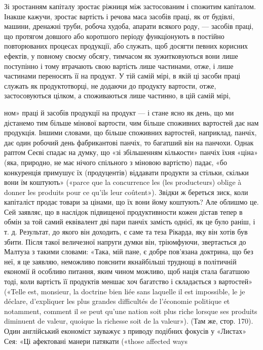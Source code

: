 Зі зростанням капіталу зростає ріжниця між застосованим
і спожитим капіталом. Інакше кажучи, зростає вартість і речова
маса засобів праці, як от будівлі, машини, дренажні труби, робоча
худоба, апарати всякого роду, — засобів праці, що протягом
довшого або коротшого періоду функціонують в постійно повторюваних
процесах продукції, або служать, щоб досягти певних
корисних ефектів, у повному своєму обсягу, тимчасом як зужитковуються
вони лише поступінно і тому втрачають свою вартість
лише частинами, отже, і лише частинами переносять її на продукт.
У тій самій мірі, в якій ці засоби праці служать як продуктотворці,
не додаючи до продукту вартости, отже, застосовуються
цілком, а споживаються лише частинно, в цій самій мірі,

ном» праці й засобів продукції на продукт — і стане ясно як день, що
ми дістанемо тим більше мінової вартости, чим більше споживних вартостей
дає нам продукція. Іншими словами, що більше споживних вартостей,
наприклад, панчіх, дає один робочий день фабрикантові панчіх,
то багатший він на панчохи. Однак раптом Сеєві спадає на думку, що «зі
збільшенням кількости» панчіх їхня «ціна» (яка, природно, не має нічого
спільного з міновою вартістю) падає, «бо конкуренція примушує їх (продуцентів)
віддавати продукти за стільки, скільки вони їм коштують»
(«parce que la concurrence les (les producteurs) oblige à donner les produits
pour ce qu’ils leur coûtent»). Звідки ж береться зиск, коли капіталіст
продає товари за цінами, що їх вони йому коштують? Але облишмо
це. Сей заявляє, що в наслідок підвищеної продуктивности кожен дістав
тепер в обмін за той самий еквівалент дві пари панчіх замість однієї, як
це було раніш, і т. д. Результат, до якого він доходить, є саме та теза
Рікарда, яку він хотів був збити. Після такої величезної напруги думки
він, тріюмфуючи, звертається до Малтуза з такими словами: «Така, мій
пане, є добре пов’язана доктрина, що без неї, я це заявляю, неможливо
пояснити якнайбільші труднощі в політичній економії й особливо питання,
яким чином можливо, щоб нація стала багатшою тоді, коли вартість її
продуктів меншає хоч багатство і складається з вартостей» («Telle est,
monsieur, la doctrine bien liée sans laquelle il est impossible, le je déclare,
d’expliquer les plus grandes difficultés de l’économie politique et notamment,
comment il se peut qu’une nation soit plus riche lorsque ses produits
diminuent de valeur, quoique la richesse soit de la valeur»). (Там же, стор.
170). Один англійський економіст зауважує з приводу подібних фокусів
у «Листах» Сея: «Ці афектовані манери патякати («those affected ways
